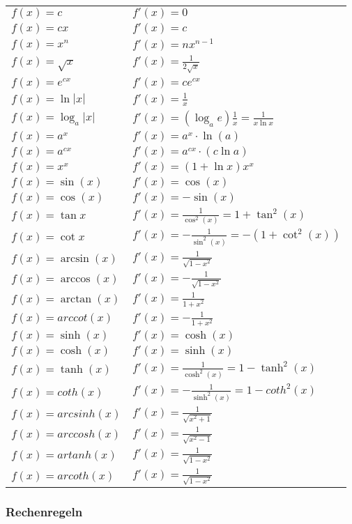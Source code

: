 \documentclass[10pt, a4paper, twocolumn]{scrartcl}
\begin{document}
\footnotesize
\begin{tabular}{ll}
 $f(x)=c$ & 		$f'(x)=0$\\
 $f(x)=cx$ &		$f'(x)=c$\\
 $f(x)=x^n$ &		$f'(x)=nx^{n-1}$\\
 $f(x)=\sqrt{x}$ &	$f'(x)=\frac{1}{2\sqrt{x}}$\\
 $f(x)=e^{cx}$ &	$f'(x)=ce^{cx}$\\
 $f(x)=\ln |x|$ &	$f'(x)=\frac{1}{x}$\\
 $f(x)=\log_a|x|$ &	$f'(x)=(\log_a e)\frac{1}{x}=\frac{1}{x\ln x}$\\
 $f(x)=a^x$ &		$f'(x)=a^x\cdotp \ln(a)$\\
 $f(x)=a^{cx}$ &	$f'(x)=a^{cx}\cdotp (c\ln a)$\\
 $f(x)=x^{x}$ &		$f'(x)=(1+\ln x)x^x$\\
 $f(x)=\sin(x)$ &	$f'(x)=\cos(x)$\\
 $f(x)=\cos(x)$ &	$f'(x)=-\sin(x)$\\
 $f(x)=\tan{x}$ &	$f'(x)=\frac{1}{\cos^2(x)}=1+\tan^2(x)$\\
 $f(x)=\cot{x}$ &	$f'(x)=-\frac{1}{\sin^2(x)}=-(1+\cot^2(x))$\\
 $f(x)=\arcsin(x)$ &	$f'(x)=\frac{1}{\sqrt{1-x^2}}$\\
 $f(x)=\arccos(x)$ &	$f'(x)=-\frac{1}{\sqrt{1-x^2}}$\\
 $f(x)=\arctan(x)$ &	$f'(x)=\frac{1}{1+x^2}$\\
 $f(x)=arccot(x)$ &	$f'(x)=-\frac{1}{1+x^2}$\\
 $f(x)=\sinh(x)$ &	$f'(x)=\cosh(x)$\\
 $f(x)=\cosh(x)$ &	$f'(x)=\sinh(x)$\\
 $f(x)=\tanh(x)$ &	$f'(x)=\frac{1}{\cosh^2(x)}=1-\tanh^2(x)$\\
 $f(x)=coth(x)$ &	$f'(x)=-\frac{1}{\sinh^2(x)}=1-coth^2(x)$\\
 $f(x)=arcsinh(x)$ &	$f'(x)=\frac{1}{\sqrt{x^2+1}}$\\
 $f(x)=arccosh(x)$ &	$f'(x)=\frac{1}{\sqrt{x^2-1}}$\\
 $f(x)=artanh(x)$ &	$f'(x)=\frac{1}{\sqrt{1-x^2}}$\\
 $f(x)=arcoth(x)$ &	$f'(x)=\frac{1}{\sqrt{1-x^2}}$\\
\end{tabular}
\normalsize

\subsubsection{Rechenregeln}
\end{document}

